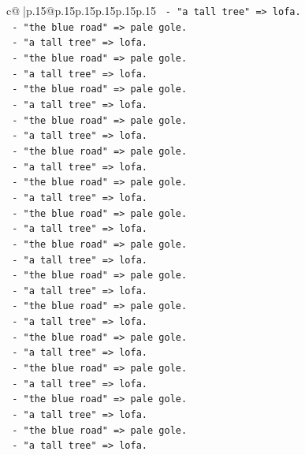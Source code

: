 \documentclass{article}
\begin{document}
{\begin{supertabular}{c@{$\;$}|p{.15\linewidth}@{}p{.15\linewidth}p{.15\linewidth}p{.15\linewidth}p{.15\linewidth}p{.15\linewidth}}
{{{\texttt{         {-} "a tall tree" => lofa.} \\
\texttt{         {-} "the blue road" => pale gole.} \\
\texttt{         {-} "a tall tree" => lofa.} \\
\texttt{         {-} "the blue road" => pale gole.} \\
\texttt{         {-} "a tall tree" => lofa.} \\
\texttt{         {-} "the blue road" => pale gole.} \\
\texttt{         {-} "a tall tree" => lofa.} \\
\texttt{         {-} "the blue road" => pale gole.} \\
\texttt{         {-} "a tall tree" => lofa.} \\
\texttt{         {-} "the blue road" => pale gole.} \\
\texttt{         {-} "a tall tree" => lofa.} \\
\texttt{         {-} "the blue road" => pale gole.} \\
\texttt{         {-} "a tall tree" => lofa.} \\
\texttt{         {-} "the blue road" => pale gole.} \\
\texttt{         {-} "a tall tree" => lofa.} \\
\texttt{         {-} "the blue road" => pale gole.} \\
\texttt{         {-} "a tall tree" => lofa.} \\
\texttt{         {-} "the blue road" => pale gole.} \\
\texttt{         {-} "a tall tree" => lofa.} \\
\texttt{         {-} "the blue road" => pale gole.} \\
\texttt{         {-} "a tall tree" => lofa.} \\
\texttt{         {-} "the blue road" => pale gole.} \\
\texttt{         {-} "a tall tree" => lofa.} \\
\texttt{         {-} "the blue road" => pale gole.} \\
\texttt{         {-} "a tall tree" => lofa.} \\
\texttt{         {-} "the blue road" => pale gole.} \\
\texttt{         {-} "a tall tree" => lofa.} \\
\texttt{         {-} "the blue road" => pale gole.} \\
\texttt{         {-} "a tall tree" => lofa.} \\
}}}
\end{supertabular}}
\end{document}
